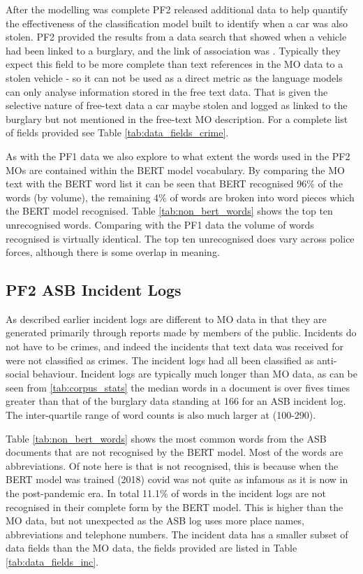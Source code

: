 After the modelling was complete PF2 released additional data to help quantify the effectiveness of the classification model built to identify when a car was also stolen. PF2 provided the results from a data search that showed when a vehicle had been linked to a burglary, and the link of association was . Typically they expect this field to be more complete than text references in the MO data to a stolen vehicle - so it can not be used as a direct metric as the language models can only analyse information stored in the free text data. That is given the selective nature of free-text data a car maybe stolen and logged as linked to the burglary but not mentioned in the free-text MO description. For a complete list of fields provided see Table \ref{tab:data_fields_crime}.

As with the PF1 data we also explore to what extent the words used in the PF2 MOs are contained within the BERT model vocabulary. By comparing the MO text with the BERT word list it can be seen that BERT recognised 96\% of the words (by volume), the remaining 4\% of words are broken into word pieces which the BERT model recognised. Table \ref{tab:non_bert_words} shows the top ten unrecognised words. Comparing with the PF1 data the volume of words recognised is virtually identical. The top ten unrecognised does vary across police forces, although there is some overlap in meaning. 


\subsection{PF2 ASB Incident Logs}As described earlier incident logs are different to MO data in that they are generated primarily through reports made by members of the public. Incidents do not have to be crimes, and indeed the incidents that text data was received for were not classified as crimes. The incident logs had all been classified as anti-social behaviour. Incident logs are typically much longer than MO data, as can be seen from \ref{tab:corpus_stats} the median words in a document is over fives times greater than that of the burglary data standing at 166 for an ASB incident log. The inter-quartile range of word counts is also much larger at (100-290).  

Table \ref{tab:non_bert_words} shows the most common words from the ASB documents that are not recognised by the BERT model. Most of the words are abbreviations. Of note here is that  is not recognised, this is because when the BERT model was trained (2018) covid was not quite as infamous as it is now in the post-pandemic era. In total 11.1\% of words in the incident logs are not recognised in their complete form by the BERT model. This is higher than the MO data, but not unexpected as the ASB log uses more place names, abbreviations and telephone numbers. The incident data has a smaller subset of data fields than the MO data, the fields provided are listed in Table \ref{tab:data_fields_inc}.


